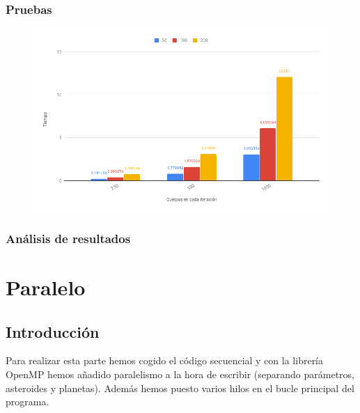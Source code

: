 \documentclass[12pt]{article}
\begin{document}
        \subsubsection{Pruebas}
            \begin{figure}[hbt!]
                \centering
                \includegraphics[width=\linewidth]{images/chart.png}
            \end{figure}
        
        
        \subsubsection{Análisis de resultados}
    \newpage
    \section{Paralelo}
        \subsection{Introducción}
        \noindent Para realizar esta parte hemos cogido el código secuencial y con la librería OpenMP hemos añadido paralelismo a la hora de escribir (separando parámetros, asteroides y planetas). Además hemos puesto varios hilos en el bucle principal del programa.
\end{document}
